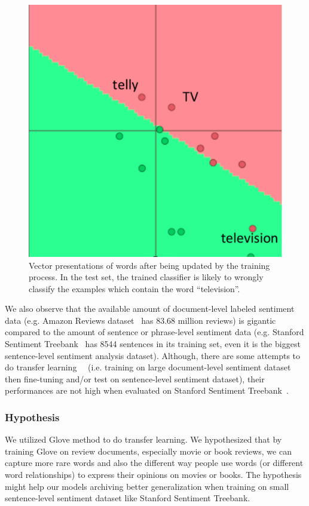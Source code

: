 \begin{figure}[H]
    \centering
    \includegraphics[scale=0.31]{figure/vec-after-update}
    \caption[Word embeddings updating causing over-fitting 2]{Vector presentations of words after being updated by the training process.
    In the test set, the trained classifier is likely to wrongly classify the examples which contain the word ``television''.}
    \label{fig:updating-word-bad-2}
\end{figure}

We also observe that the available amount of document-level labeled sentiment data (e.g. Amazon Reviews dataset~\cite{amazon-reviews} has 83.68 million reviews) is gigantic compared to the amount of sentence or phrase-level sentiment data (e.g. Stanford Sentiment Treebank~\cite{socher2013recursive} has 8544 sentences in its training set, even it is the biggest sentence-level sentiment analysis dataset).
Although, there are some attempts to do transfer learning~\cite{group-instance}~\cite{re-embedding} (i.e. training on large document-level sentiment dataset then fine-tuning and/or test on sentence-level sentiment dataset), their performances are not high when evaluated on Stanford Sentiment Treebank~\cite{group-instance}.

\subsubsection{Hypothesis}
We utilized Glove method to do transfer learning.
We hypothesized that by training Glove on review documents, especially movie or book reviews, we can capture more rare words and also the different way people use words (or different word relationships) to express their opinions on movies or books.
The hypothesis might help our models archiving better generalization when training on small sentence-level sentiment dataset like Stanford Sentiment Treebank.

